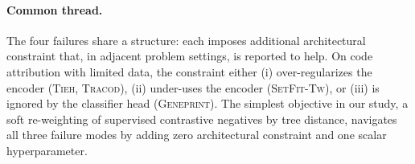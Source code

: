 ﻿\documentclass[11pt]{article}
\begin{document}
\paragraph{Common thread.} The four failures share a structure: each
imposes additional architectural constraint that, in adjacent
problem settings, is reported to help. On code attribution with
limited data, the constraint either (i) over-regularizes the
encoder (\textsc{Tieh}, \textsc{Tracod}), (ii) under-uses the
encoder (\textsc{SetFit-Tw}), or (iii) is ignored by the
classifier head (\textsc{Geneprint}). The simplest objective in our study, a soft re-weighting of supervised contrastive negatives by tree distance, navigates all three failure modes by adding zero
architectural constraint and one scalar hyperparameter.

\nolinenumbers
\end{document}
